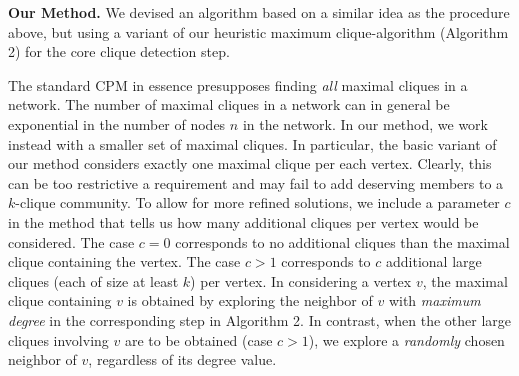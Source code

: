 {\bf Our Method. } We devised an algorithm based on a similar idea as the procedure
above, but using a variant of our heuristic maximum clique-algorithm 
(Algorithm 2) for the core clique detection step. 

The standard CPM in essence presupposes finding {\em all} maximal cliques in a network.
The number of maximal cliques in a network can in general be exponential in the number of nodes $n$ in the network. In our method, we work instead with a smaller set of maximal cliques. In particular, the basic variant of our method considers exactly one maximal clique per each vertex. Clearly, this can be too restrictive a requirement and may fail to add deserving members to a $k$-clique community. 
To allow for more refined solutions, we include a parameter $c$
in the method that tells us how many additional cliques per vertex would be considered.
The case $c=0$ corresponds to no additional cliques than the maximal clique containing the vertex. The case $c>1$ corresponds to $c$ additional large cliques (each of size at least $k$)
per vertex.  In considering a vertex $v$, the maximal clique containing $v$ 
is obtained by exploring the neighbor of $v$ with {\em maximum degree} 
in the corresponding step in Algorithm 2.
In contrast, when the other large cliques involving $v$ are to be obtained (case $c>1$),
we explore a {\em randomly} chosen neighbor of $v$, regardless of its degree value.




